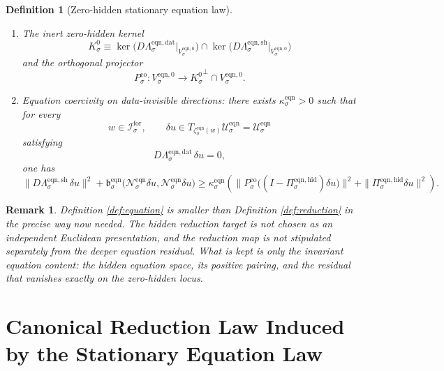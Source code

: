 \documentclass[11pt]{article}
\newcommand{\ForSpace}[1]{\mathcal I_{#1}^{\mathrm{for}}}
\newcommand{\Kernel}[1]{K_{#1}^{0}}
\newcommand{\StateComp}[1]{P_{#1}^{\mathrm{co}}}
\newcommand{\EqnSpace}[1]{\mathcal U_{#1}^{\mathrm{eqn}}}
\newcommand{\EqnData}[1]{\Lambda_{#1}^{\mathrm{eqn,dat}}}
\newcommand{\EqnShell}[1]{\Lambda_{#1}^{\mathrm{eqn,sh}}}
\newcommand{\EqnPair}[1]{\mathfrak b_{#1}^{\mathrm{eqn}}}
\newcommand{\EqnZero}[1]{V_{#1}^{\mathrm{eqn},0}}
\newcommand{\EqnProj}[1]{\Pi_{#1}^{\mathrm{eqn,hid}}}
\newcommand{\EqnLin}[1]{\mathcal N_{#1}^{\mathrm{eqn}}}
\newcommand{\EqnEmbed}[1]{\zeta_{#1}^{\mathrm{eqn}}}
\newtheorem{definition}{Definition}
\newtheorem{remark}{Remark}
\begin{document}
\begin{definition}[Zero-hidden stationary equation law]
\begin{enumerate}
\begin{equation}
    \Bigr).
    \label{eq:eqnsolvability}
    \end{equation}
    \item The inert zero-hidden kernel
    \[
    \Kernel{\sigma}
    \equiv
    \ker\bigl(D\EqnData{\sigma}\big|_{\EqnZero{\sigma}}\bigr)
    \cap
    \ker\bigl(D\EqnShell{\sigma}\big|_{\EqnZero{\sigma}}\bigr)
    \]
    and the orthogonal projector
    \[
    \StateComp{\sigma}:
    \EqnZero{\sigma}\to
    {\Kernel{\sigma}}^{\perp}\cap\EqnZero{\sigma}.
    \]
    \item Equation coercivity on data-invisible directions: there exists \(\kappa_{\sigma}^{\mathrm{eqn}}>0\) such that for every
    \[
    w\in\ForSpace{\sigma},
    \qquad
    \delta u\in T_{\EqnEmbed{\sigma}(w)}\EqnSpace{\sigma}=\EqnSpace{\sigma}
    \]
    satisfying
    \[
    D\EqnData{\sigma}\,\delta u=0,
    \]
    one has
    \begin{equation}
    \|D\EqnShell{\sigma}\,\delta u\|^{2}
    +
    \EqnPair{\sigma}\bigl(\EqnLin{\sigma}\delta u,\EqnLin{\sigma}\delta u\bigr)
    \ge
    \kappa_{\sigma}^{\mathrm{eqn}}
    \left(
    \|\StateComp{\sigma}\bigl((I-\EqnProj{\sigma})\delta u\bigr)\|^{2}
    +
    \|\EqnProj{\sigma}\delta u\|^{2}
    \right).
    \label{eq:eqncoercive}
    \end{equation}
\end{enumerate}
\end{definition}

\begin{remark}
Definition \ref{def:equation} is smaller than Definition \ref{def:reduction} in the precise way now needed. The hidden reduction target is not chosen as an independent Euclidean presentation, and the reduction map is not stipulated separately from the deeper equation residual. What is kept is only the invariant equation content: the hidden equation space, its positive pairing, and the residual that vanishes exactly on the zero-hidden locus.
\end{remark}

\section{Canonical Reduction Law Induced by the Stationary Equation Law}
\end{document}
